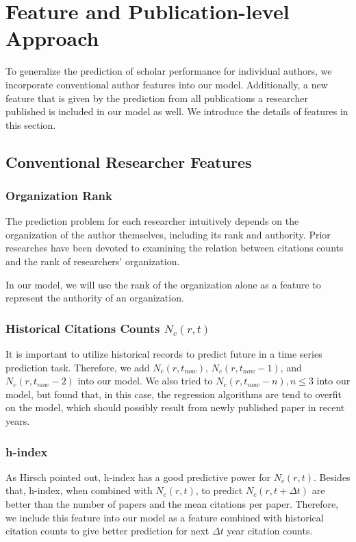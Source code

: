 \section{Feature and Publication-level Approach}
To generalize the prediction of scholar performance for individual authors, we incorporate conventional author features into our model.
Additionally, a new feature that is given by the prediction from all publications a researcher published is included in our model as well.
We introduce the details of features in this section.

\subsection{Conventional Researcher Features}
\subsubsection{Organization Rank}
The prediction problem for each researcher intuitively depends on the organization of the author themselves, including its rank and authority.
Prior researches have been devoted to examining the relation between citations counts and the rank of researchers' organization\cite{van2005fatal}.

In our model, we will use the rank of the organization alone as a feature to represent the authority of an organization.
\subsubsection{Historical Citations Counts $N_c(r,t)$}
It is important to utilize historical records to predict future in a time series prediction task\cite{weigend1994time}.
Therefore, we add $N_c(r,t_{now})$, $N_c(r,t_{now}-1)$, and $N_c(r,t_{now}-2)$ into our model.
We also tried to $N_c(r,t_{now}-n), n\leq 3$ into our model, but found that, in this case, the regression algorithms are tend to overfit on the model,
which should possibly result from newly published paper in recent years.
\subsubsection{h-index}
As Hirsch pointed out\cite{hirsch2007does}, h-index has a good predictive power for $N_c(r,t)$.
Besides that, h-index, when combined with $N_c(r,t)$, to predict $N_c(r,t+\Delta t)$ are better than the number of papers and the mean citations per paper.
Therefore, we include this feature into our model as a feature combined with historical citation counts to give better prediction for next $\Delta t$ year citation counts.

